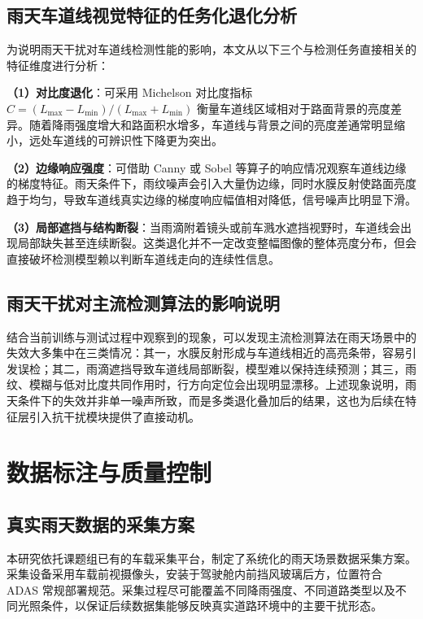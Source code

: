 \subsection{雨天车道线视觉特征的任务化退化分析}

为说明雨天干扰对车道线检测性能的影响，本文从以下三个与检测任务直接相关的特征维度进行分析：

\textbf{（1）对比度退化}：可采用 Michelson 对比度指标 $C = (L_\text{max} - L_\text{min}) / (L_\text{max} + L_\text{min})$ 衡量车道线区域相对于路面背景的亮度差异。随着降雨强度增大和路面积水增多，车道线与背景之间的亮度差通常明显缩小，远处车道线的可辨识性下降更为突出。

\textbf{（2）边缘响应强度}：可借助 Canny 或 Sobel 等算子的响应情况观察车道线边缘的梯度特征。雨天条件下，雨纹噪声会引入大量伪边缘，同时水膜反射使路面亮度趋于均匀，导致车道线真实边缘的梯度响应幅值相对降低，信号噪声比明显下滑。

\textbf{（3）局部遮挡与结构断裂}：当雨滴附着镜头或前车溅水遮挡视野时，车道线会出现局部缺失甚至连续断裂。这类退化并不一定改变整幅图像的整体亮度分布，但会直接破坏检测模型赖以判断车道线走向的连续性信息。

\subsection{雨天干扰对主流检测算法的影响说明}

结合当前训练与测试过程中观察到的现象，可以发现主流检测算法在雨天场景中的失效大多集中在三类情况：其一，水膜反射形成与车道线相近的高亮条带，容易引发误检；其二，雨滴遮挡导致车道线局部断裂，模型难以保持连续预测；其三，雨纹、模糊与低对比度共同作用时，行方向定位会出现明显漂移。上述现象说明，雨天条件下的失效并非单一噪声所致，而是多类退化叠加后的结果，这也为后续在特征层引入抗干扰模块提供了直接动机。


\section{数据标注与质量控制}
\label{sec:data_annotation}

\subsection{真实雨天数据的采集方案}

本研究依托课题组已有的车载采集平台，制定了系统化的雨天场景数据采集方案。采集设备采用车载前视摄像头，安装于驾驶舱内前挡风玻璃后方，位置符合 ADAS 常规部署规范。采集过程尽可能覆盖不同降雨强度、不同道路类型以及不同光照条件，以保证后续数据集能够反映真实道路环境中的主要干扰形态。

